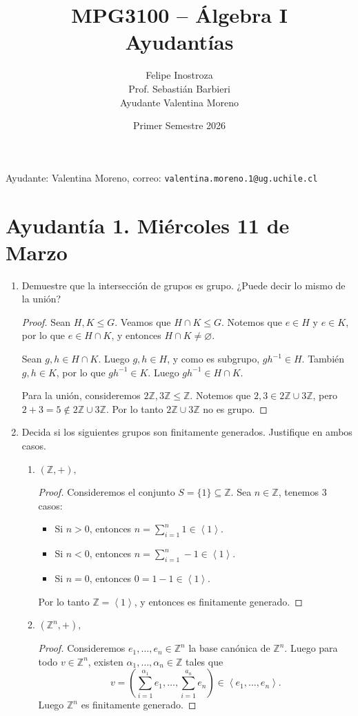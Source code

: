 \documentclass{article}
\title{MPG3100 -- Álgebra I \\ Ayudantías}
\author{Felipe Inostroza \\ Prof. Sebastián Barbieri \\ Ayudante Valentina Moreno}
\date{Primer Semestre 2026}
\theoremstyle{definition}
\theoremstyle{remark}
\numberwithin{equation}{section}
\newcommand{\Z}{\mathbb{Z}}
\renewcommand{\a}{\alpha}
\newcommand{\br}[1]{\left( #1 \right)}
\newcommand{\gen}[1]{\left\langle #1 \right\rangle}
\begin{document}
\maketitle

Ayudante: Valentina Moreno, correo: \texttt{valentina.moreno.1@ug.uchile.cl}
\tableofcontents

\newpage
\section{Ayudantía 1. Miércoles 11 de Marzo}


\begin{enumerate}

\item Demuestre que la intersección de grupos es grupo. ¿Puede decir lo mismo de la unión?
\begin{proof}
    Sean $H,K \leqslant G$. Veamos que $H \cap K \leqslant G$.
    Notemos que $e \in H$ y $e \in K$, por lo que $e \in H \cap K$, y entonces $H \cap K \neq \varnothing$.

    Sean $g,h \in H \cap K$. Luego $g,h \in H$, y como es subgrupo, $gh^{-1} \in H$. También $g,h \in K$, por lo que $gh^{-1} \in K$. Luego $gh^{-1} \in H \cap K$.

    Para la unión, consideremos $2\Z, 3\Z \leqslant \Z$. Notemos que $2,3 \in 2\Z \cup 3\Z$, pero $2+3 = 5 \notin 2\Z \cup 3\Z$. Por lo tanto $2\Z \cup 3\Z$ no es grupo.
\end{proof}

\item Decida si los siguientes grupos son finitamente generados. Justifique en ambos casos.

\begin{enumerate}
\item $(\mathbb{Z},+),$
\begin{proof}
    Consideremos el conjunto $S = \{1\} \subseteq \Z$. Sea $n \in \Z$, tenemos 3 casos:
    \begin{itemize}
        \item Si $n>0$, entonces $n = \sum_{i=1}^n 1 \in \gen{1}$.
        \item Si $n<0$, entonces $n = \sum_{i=1}^n -1 \in \gen{1}$.
        \item Si $n=0$, entonces $0 = 1-1 \in \gen{1}$.
    \end{itemize}
    Por lo tanto $\Z = \gen{1}$, y entonces es finitamente generado.
\end{proof}

\item $(\mathbb{Z}^{n},+),$
\begin{proof}
    Consideremos $e_1, \dots, e_n \in \Z^n$ la base canónica de $\Z^n$. Luego para todo $v \in \Z^n$, existen $\a_1, \dots, \a_n \in \Z$ tales que
    \[v = \br{\sum_{i=1}^{\a_1} e_1, \dots, \sum_{i=1}^{a_n} e_n} \in \gen{e_1,\dots,e_n}.\]
    Luego $\Z^n$ es finitamente generado.
\end{proof}


\end{enumerate}
\end{enumerate}
\end{document}
